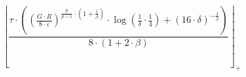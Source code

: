 \[\left\lfloor \frac{\tau \cdot \left(\left(\frac{G \cdot R}{8 \cdot \varepsilon}\right)^{\frac{p}{p - 1} \cdot \left(1 + \frac{1}{\beta}\right)} \cdot \log\left(\frac{1}{\delta} \cdot \frac{1}{4}\right) + \left(16 \cdot \delta\right)^{-\frac{1}{\beta}}\right)}{8 \cdot \left(1 + 2 \cdot \beta\right)} \right\rfloor_{+}\]
